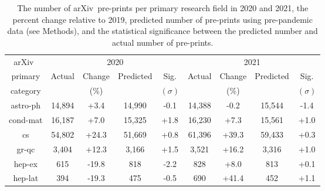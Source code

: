 \documentclass[]{rsos}%
\newcommand{\arxiv}{arXiv}
\begin{document}
\newcommand{\totalcell}[1]{\cellcolor{gray!25}\textbf{#1}}

\begin{table}
       \caption{The number of \arxiv\ pre-prints per primary research field in 2020 and 2021, the percent change relative to 2019, predicted number of pre-prints using pre-pandemic data (see Methods), and the statistical significance between the predicted number and actual number of pre-prints.}
\begin{center}
\small
    \label{tab:table1}
    \begin{tabular}{|c|cccc|cccc|} 
    \hline
\arxiv\ & \multicolumn{4}{c|}{2020}  & \multicolumn{4}{c|}{2021} \\
primary & Actual & Change & Predicted & Sig. & Actual & Change & Predicted & Sig.  \\
category	& & (\%) &  &  $(\sigma)$ & & (\%) &  & $(\sigma)$ \\
\hline
astro-ph &  14,894 &  +3.4 &  14,990       & -0.1 &  14,388 &  -0.2 &  15,544        & -1.4 \\
cond-mat &  16,187 &  +7.0 &  15,325       & +1.8 &  16,230 &  +7.3 &  15,561        & +1.0 \\
cs &  54,802 & +24.3 &  51,669       & +0.8 &  61,396 & +39.3 &  59,433        & +0.3 \\
gr-qc &   3,404 & +12.3 &   3,166       & +1.5 &   3,521 & +16.2 &   3,316        & +1.0 \\
hep-ex &     615 & -19.8 &     818       & -2.2 &     828 &  +8.0 &     813        & +0.1 \\
hep-lat &     394 & -19.3 &     475       & -0.5 &     690 & +41.4 &     452        & +1.1 \\

\end{tabular}
\end{center}
\end{table}
\end{document}
